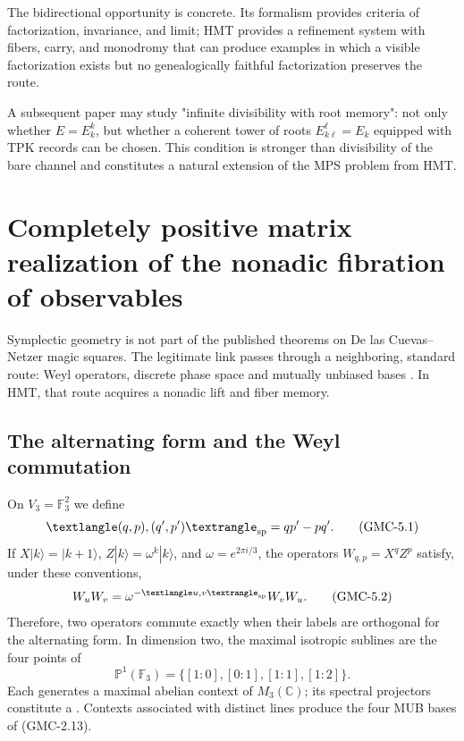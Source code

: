 The bidirectional opportunity is concrete. Its formalism provides criteria of
factorization, invariance, and limit; HMT provides a refinement system with
fibers, carry, and monodromy that can produce examples in which a visible
factorization exists but no genealogically faithful factorization
preserves the route.

\begin{workbox}
A subsequent paper may study "infinite divisibility with root
memory": not only whether $E=E_k^k$, but whether a coherent tower of
roots $E_{k\ell}^\ell=E_k$ equipped with TPK records can be chosen. This condition is
stronger than divisibility of the bare channel and constitutes a natural
extension of the MPS problem from HMT.
\end{workbox}
\fi


\section{Completely positive matrix realization of the nonadic fibration of observables}
\label{p12-83-c22-s8:gmc:chap:simplectica}

Symplectic geometry is not part of the published theorems on
De las Cuevas--Netzer magic squares. The legitimate link passes through a
neighboring, standard route: Weyl operators, discrete phase space and
mutually unbiased bases \citep{gibbons2004phase,planat2007rings}. In HMT,
that route acquires a nonadic lift and fiber memory.

\subsection{The alternating form and the Weyl commutation}

On $V_3=\mathbb F_3^2$ we define
\[
 \langle(q,p),(q',p')\rangle_{\rm sp}=qp'-pq'.
 \tag{GMC-5.1}
\]
If $X|k\rangle=|k+1\rangle$,
$Z|k\rangle=\omega^k|k\rangle$, and $\omega=e^{2\pi i/3}$, the operators
$W_{q,p}=X^qZ^p$ satisfy, under these conventions,
\[
 W_uW_v=\omega^{-\langle u,v\rangle_{\rm sp}}W_vW_u.
 \tag{GMC-5.2}
\]
Therefore, two operators commute exactly when their labels are
orthogonal for the alternating form. In dimension two, the maximal
isotropic sublines are the four points of
\[
 \mathbb P^1(\mathbb F_3)=\{[1:0],[0:1],[1:1],[1:2]\}.
 \tag{GMC-5.3}
\]
Each generates a maximal abelian context of $M_3(\mathbb C)$; its
spectral projectors constitute a \PVM. Contexts associated with distinct
lines produce the four MUB bases of \textup{(GMC-2.13)}.

